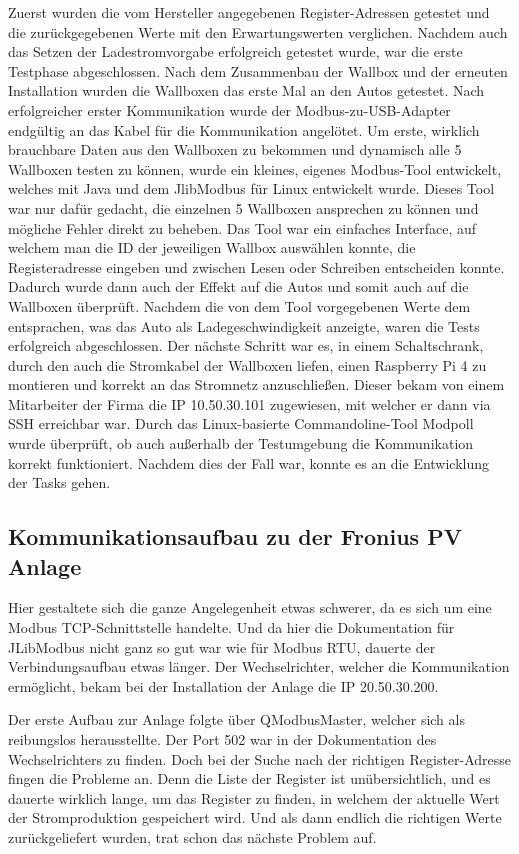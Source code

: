 Zuerst wurden die vom Hersteller angegebenen Register-Adressen getestet und die zurückgegebenen Werte mit den Erwartungswerten verglichen. Nachdem auch das Setzen der Ladestromvorgabe erfolgreich getestet wurde, war die erste Testphase abgeschlossen. Nach dem Zusammenbau der Wallbox und der erneuten Installation wurden die Wallboxen das erste Mal an den Autos getestet. Nach erfolgreicher erster Kommunikation wurde der Modbus-zu-USB-Adapter endgültig an das Kabel für die Kommunikation angelötet. Um erste, wirklich brauchbare Daten aus den Wallboxen zu bekommen und dynamisch alle 5 Wallboxen testen zu können, wurde ein kleines, eigenes Modbus-Tool entwickelt, welches mit Java und dem JlibModbus für Linux entwickelt wurde. Dieses Tool war nur dafür gedacht, die einzelnen 5 Wallboxen ansprechen zu können und mögliche Fehler direkt zu beheben. Das Tool war ein einfaches Interface, auf welchem man die ID der jeweiligen Wallbox auswählen konnte, die Registeradresse eingeben und zwischen Lesen oder Schreiben entscheiden konnte. Dadurch wurde dann auch der Effekt auf die Autos und somit auch auf die Wallboxen überprüft. Nachdem die von dem Tool vorgegebenen Werte dem entsprachen, was das Auto als Ladegeschwindigkeit anzeigte, waren die Tests erfolgreich abgeschlossen. Der nächste Schritt war es, in einem Schaltschrank, durch den auch die Stromkabel der Wallboxen liefen, einen Raspberry Pi 4 zu montieren und korrekt an das Stromnetz anzuschließen. Dieser bekam von einem Mitarbeiter der Firma die IP 10.50.30.101 zugewiesen, mit welcher er dann via SSH erreichbar war. Durch das Linux-basierte Commandoline-Tool Modpoll wurde überprüft, ob auch außerhalb der Testumgebung die Kommunikation korrekt funktioniert. Nachdem dies der Fall war, konnte es an die Entwicklung der Tasks gehen. 

\subsection{Kommunikationsaufbau zu der Fronius PV Anlage }
Hier gestaltete sich die ganze Angelegenheit etwas schwerer, da es sich um eine Modbus TCP-Schnittstelle handelte. Und da hier die Dokumentation für JLibModbus nicht ganz so gut war wie für Modbus RTU, dauerte der Verbindungsaufbau etwas länger. Der Wechselrichter, welcher die Kommunikation ermöglicht, bekam bei der Installation der Anlage die IP 20.50.30.200.   

Der erste Aufbau zur Anlage folgte über QModbusMaster, welcher sich als reibungslos herausstellte. Der Port 502 war in der Dokumentation des Wechselrichters zu finden. Doch bei der Suche nach der richtigen Register-Adresse fingen die Probleme an. Denn die Liste der Register ist unübersichtlich, und es dauerte wirklich lange, um das Register zu finden, in welchem der aktuelle Wert der Stromproduktion gespeichert wird. Und als dann endlich die richtigen Werte zurückgeliefert wurden, trat schon das nächste Problem auf.   

